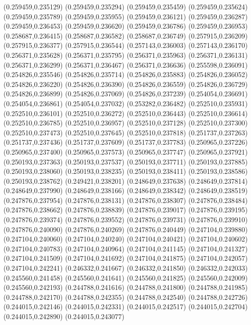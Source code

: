 (0.259459,0.235129)
(0.259459,0.235294)
(0.259459,0.235459)
(0.259459,0.235624)
(0.259459,0.235789)
(0.259459,0.235955)
(0.259459,0.236121)
(0.259459,0.236287)
(0.259459,0.236453)
(0.259459,0.236620)
(0.259459,0.236786)
(0.259459,0.236953)
(0.258687,0.236415)
(0.258687,0.236582)
(0.258687,0.236749)
(0.257915,0.236209)
(0.257915,0.236377)
(0.257915,0.236544)
(0.257143,0.236003)
(0.257143,0.236170)
(0.256371,0.235628)
(0.256371,0.235795)
(0.256371,0.235963)
(0.256371,0.236131)
(0.256371,0.236299)
(0.256371,0.236467)
(0.256371,0.236636)
(0.255598,0.236091)
(0.254826,0.235546)
(0.254826,0.235714)
(0.254826,0.235883)
(0.254826,0.236052)
(0.254826,0.236220)
(0.254826,0.236390)
(0.254826,0.236559)
(0.254826,0.236729)
(0.254826,0.236899)
(0.254826,0.237069)
(0.254826,0.237239)
(0.254054,0.236691)
(0.254054,0.236861)
(0.254054,0.237032)
(0.253282,0.236482)
(0.252510,0.235931)
(0.252510,0.236101)
(0.252510,0.236272)
(0.252510,0.236443)
(0.252510,0.236614)
(0.252510,0.236785)
(0.252510,0.236957)
(0.252510,0.237128)
(0.252510,0.237300)
(0.252510,0.237473)
(0.252510,0.237645)
(0.252510,0.237818)
(0.251737,0.237263)
(0.251737,0.237436)
(0.251737,0.237609)
(0.251737,0.237783)
(0.250965,0.237226)
(0.250965,0.237400)
(0.250965,0.237573)
(0.250965,0.237747)
(0.250965,0.237921)
(0.250193,0.237363)
(0.250193,0.237537)
(0.250193,0.237711)
(0.250193,0.237885)
(0.250193,0.238060)
(0.250193,0.238235)
(0.250193,0.238411)
(0.250193,0.238586)
(0.250193,0.238762)
(0.249421,0.238201)
(0.248649,0.237638)
(0.248649,0.237814)
(0.248649,0.237990)
(0.248649,0.238166)
(0.248649,0.238342)
(0.248649,0.238519)
(0.247876,0.237954)
(0.247876,0.238131)
(0.247876,0.238307)
(0.247876,0.238484)
(0.247876,0.238662)
(0.247876,0.238839)
(0.247876,0.239017)
(0.247876,0.239195)
(0.247876,0.239374)
(0.247876,0.239552)
(0.247876,0.239731)
(0.247876,0.239910)
(0.247876,0.240090)
(0.247876,0.240269)
(0.247876,0.240449)
(0.247104,0.239880)
(0.247104,0.240060)
(0.247104,0.240240)
(0.247104,0.240421)
(0.247104,0.240602)
(0.247104,0.240783)
(0.247104,0.240964)
(0.247104,0.241145)
(0.247104,0.241327)
(0.247104,0.241509)
(0.247104,0.241692)
(0.247104,0.241875)
(0.247104,0.242057)
(0.247104,0.242241)
(0.246332,0.241667)
(0.246332,0.241850)
(0.246332,0.242033)
(0.245560,0.241458)
(0.245560,0.241641)
(0.245560,0.241825)
(0.245560,0.242009)
(0.245560,0.242193)
(0.244788,0.241616)
(0.244788,0.241800)
(0.244788,0.241985)
(0.244788,0.242170)
(0.244788,0.242355)
(0.244788,0.242540)
(0.244788,0.242726)
(0.244015,0.242146)
(0.244015,0.242331)
(0.244015,0.242517)
(0.244015,0.242704)
(0.244015,0.242890)
(0.244015,0.243077)
